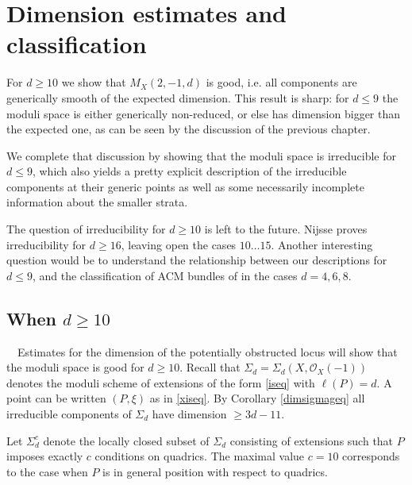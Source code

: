 \documentclass{amsart}
\theoremstyle{plain}
\numberwithin{equation}{section}
\begin{document}
\section{Dimension estimates and classification}
\label{sec7}

For $d\geq 10$ we show that $M_X(2,-1,d)$ is good, i.e.
all components are generically smooth of the expected dimension. 
This result is sharp: for $d\leq 9$ the moduli space is either generically 
non-reduced, or else has dimension bigger than the expected one, as can be seen
by the discussion of the previous chapter. 

We complete that discussion by showing that the moduli 
space is irreducible for $d\leq 9$, which also yields a pretty explicit
description of the irreducible components at their generic points as well as
some necessarily incomplete information about the smaller strata.

The question of irreducibility for $d\geq 10$ is left to the future. 
Nijsse \cite{Nijsse} proves irreducibility for $d\geq 16$, leaving open
the cases $10\ldots 15$. 
Another interesting question would be to understand
the relationship between our descriptions for $d\leq 9$, and the classification of ACM bundles of \cite{ChiantiniFaenzi}
in the cases $d=4,6,8$. 

\subsection{When $d\geq 10$}
$\mbox{ }$
\newline
Estimates for the dimension
of the potentially obstructed locus will show that the moduli space is good for $d\geq 10$. 
Recall that $\Sigma _d= \Sigma _d(X,{{\mathcal O}} _X(-1))$ 
denotes the moduli scheme of extensions of the form \eqref{iseq} with 
$\ell (P)=d$. 
A point can be written $(P,\xi )$ as in \eqref{xiseq}. 
By Corollary \ref{dimsigmageq} all irreducible components of $\Sigma _d$ have
dimension $\geq 3d-11$. 

Let $\Sigma _d^c$ denote the locally closed subset of $\Sigma _d$ consisting
of extensions such that $P$ imposes exactly $c$ conditions on quadrics. The maximal value $c=10$ corresponds to the case when $P$ is in general position with respect to quadrics.
\end{document}
